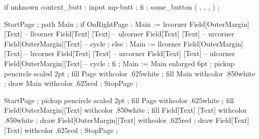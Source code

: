 \startbuffer[symb-a]
  if unknown context_butt : input mp-butt ; fi ;
  some_button ( ,
                ,
                ,
                 ) ;
\stopuniqueMPgraphic
\stopbuffer

\startbuffer[symb-b]
\stopbuffer

\startbuffer[symb-c]

\stopbuffer


\startbuffer[pagetext]
\subject{Edward  R. Tufte}         \par
\subject{Donald  E. Knuth}         \par
\subject{Douglas R. Hostadter}   \page
\stopbuffer

\startbuffer[back-0]
\setupbackgrounds[page][background=page]
\stopbuffer

\startbuffer[back-1]
  StartPage ;
    path Main ;
    if OnRightPage :
      Main := lrcorner Field[OuterMargin][Text] --
              llcorner Field[Text]       [Text] --
              ulcorner Field[Text]       [Text] --
              urcorner Field[OuterMargin][Text] -- cycle ;
    else :
      Main := llcorner Field[OuterMargin][Text] --
              lrcorner Field[Text]       [Text] --
              urcorner Field[Text]       [Text] --
              ulcorner Field[OuterMargin][Text] -- cycle ;
    fi ;
    Main := Main enlarged 6pt ;
    pickup pencircle scaled 2pt ;
    fill Page withcolor .625white ;
    fill Main withcolor .850white ;
    draw Main withcolor .625red ;
  StopPage ;
\stopuseMPgraphic
\stopbuffer

\startbuffer[back-2]
  StartPage ;
    pickup pencircle scaled 2pt ;
    fill Page                     withcolor .625white ;
    fill Field[OuterMargin][Text] withcolor .850white ;
    fill Field[Text]       [Text] withcolor .850white ;
    draw Field[OuterMargin][Text] withcolor .625red ;
    draw Field[Text]       [Text] withcolor .625red ;
  StopPage ;
\stopuseMPgraphic
\stopbuffer

